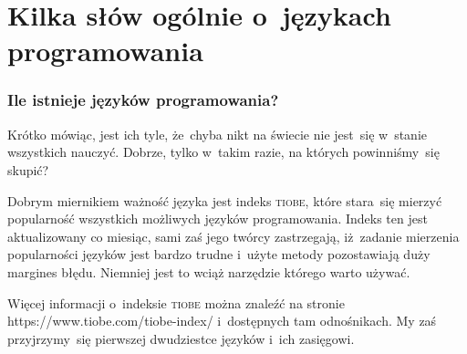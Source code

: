 \documentclass[10pt,t]{beamer}
\begin{document}
\section{Kilka słów ogólnie o~językach programowania}


\begin{frame}
  \frametitle{Ile istnieje języków programowania?}


  Krótko mówiąc, jest ich tyle, że~chyba nikt na świecie nie jest~się
  w~stanie wszystkich nauczyć. Dobrze, tylko w~takim razie, na których
  powinniśmy~się skupić?

  Dobrym miernikiem ważność języka jest indeks \textsc{tiobe}, które
  stara~się mierzyć popularność wszystkich możliwych języków programowania.
  Indeks ten jest aktualizowany co miesiąc, sami zaś jego twórcy
  zastrzegają, iż~zadanie mierzenia popularności języków jest bardzo trudne
  i~użyte metody pozostawiają duży margines błędu. Niemniej jest to wciąż
  narzędzie którego warto używać.

  Więcej informacji o~indeksie \textsc{tiobe} można znaleźć na stronie \\
  {https://www.tiobe.com/tiobe-index/} i~dostępnych tam odnośnikach.
  My zaś przyjrzymy~się pierwszej dwudziestce języków i~ich zasięgowi.

\end{frame}
\end{document}
